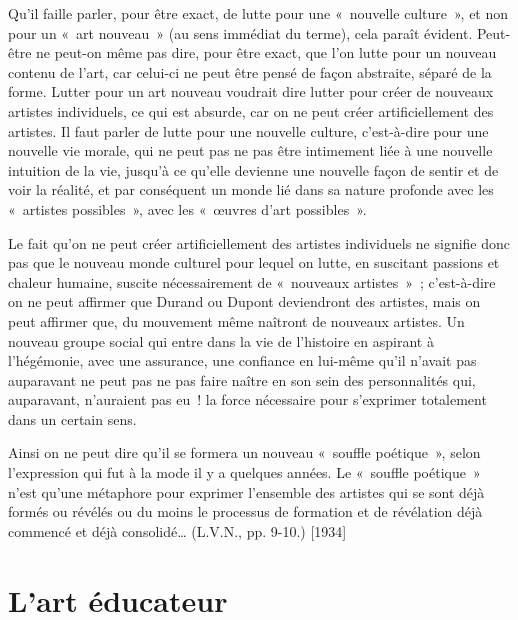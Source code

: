 \documentclass[french,twoside]{book} %
\begin{document}
Qu'il faille parler, pour être exact, de lutte pour une « nouvelle culture », et non pour un « art nouveau » (au sens immédiat du terme), cela paraît évident. Peut-être ne peut-on même pas dire, pour être exact, que l’on lutte pour un nouveau contenu de l’art, car celui-ci ne peut être pensé de façon abstraite, séparé de la forme. Lutter pour un art nouveau voudrait dire lutter pour créer de nouveaux artistes individuels, ce qui est absurde, car on ne peut créer artificiellement des artistes. Il faut parler de lutte pour une nouvelle culture, c’est-à-dire pour une nouvelle vie morale, qui ne peut pas ne pas être intimement liée à une nouvelle intuition de la vie, jusqu’à ce qu’elle devienne une nouvelle façon de sentir et de voir la réalité, et par conséquent un monde lié dans sa nature profonde avec les « artistes possibles », avec les « œuvres d’art possibles ».\par
Le fait qu’on ne peut créer artificiellement des artistes individuels ne signifie donc pas que le nouveau monde culturel pour lequel on lutte, en suscitant passions et chaleur humaine, suscite nécessairement de « nouveaux artistes » ; c’est-à-dire on ne peut affirmer que Durand ou Dupont deviendront des artistes, mais on peut affirmer que, du mouvement même naîtront de nouveaux artistes. Un nouveau groupe social qui entre dans la vie de l’histoire en aspirant à l’hégémonie, avec une assurance, une confiance en lui-même qu’il n’avait pas auparavant ne peut pas ne pas faire naître en son sein des personnalités qui, auparavant, n’auraient pas eu ! la force nécessaire pour s’exprimer totalement dans un certain sens.\par
Ainsi on ne peut dire qu’il se formera un nouveau « souffle poétique », selon l’expression qui fut à la mode il y a quelques années. Le « souffle poétique » n’est qu’une métaphore pour exprimer l’ensemble des artistes qui se sont déjà formés ou révélés ou du moins le processus de formation et de révélation déjà commencé et déjà consolidé… (L.V.N., pp. 9-10.) [1934]
\section[{L'art éducateur}]{L'art éducateur}
\end{document}
